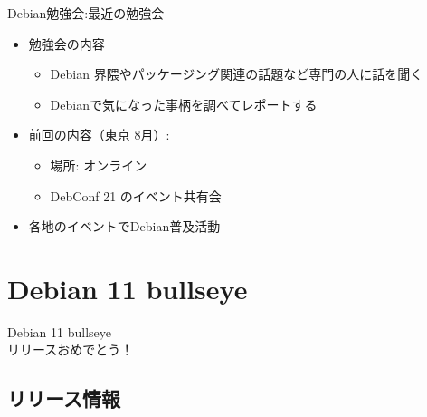 \begin{frame}{Debian勉強会:最近の勉強会}
  
\begin{itemize}
\item 勉強会の内容
  \begin{itemize}
  \item Debian 界隈やパッケージング関連の話題など専門の人に話を聞く
  \item Debianで気になった事柄を調べてレポートする
  \end{itemize}
\item 前回の内容（東京 8月）:
  \begin{itemize}
  \item 場所: オンライン
  \item DebConf 21 のイベント共有会
  \end{itemize}
\item 各地のイベントでDebian普及活動
\end{itemize}

\end{frame}


\section{Debian 11 bullseye}

\begin{frame}
  \begin{center}\Huge{Debian 11 bullseye\\リリースおめでとう！}\end{center}
\end{frame}

\subsection{リリース情報}

